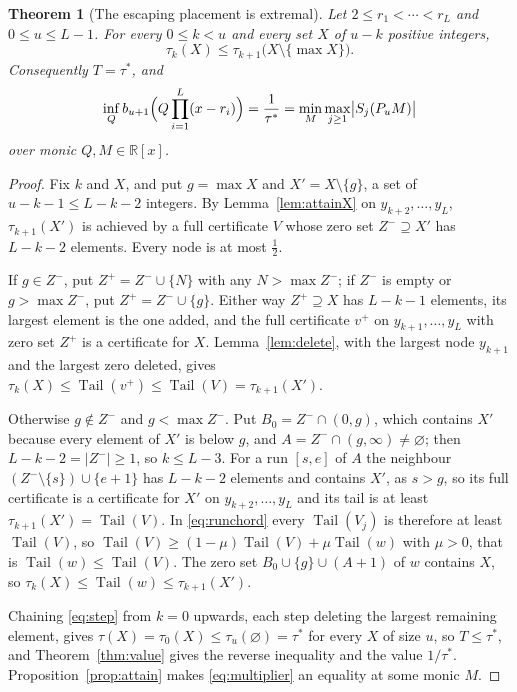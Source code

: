 \documentclass[11pt]{article}
\newtheorem{theorem}{Theorem}[section]
\theoremstyle{definition}
\theoremstyle{plain}
\newcommand{\R}{\mathbb R}
\DeclareMathOperator{\Tail}{Tail}
\begin{document}
\begin{theorem}[The escaping placement is extremal]\label{thm:extremal}
Let $2\le r_1<\cdots<r_L$ and $0\le u\le L-1$.  For every $0\le k<u$ and every
set $X$ of $u-k$ positive integers,
\begin{equation}\label{eq:step}
  \tau_k(X)\le\tau_{k+1}\bigl(X\setminus\{\max X\}\bigr).
\end{equation}
Consequently $T=\tau^*$, and
\[
  \inf_Qb_{u+1}\Bigl(Q\prod_{i=1}^L(x-r_i)\Bigr)=\frac1{\tau^*}
  =\min_M\max_{j\ge1}\bigl|S_j(P_uM)\bigr|
\]
over monic $Q,M\in\R[x]$.
\end{theorem}

\begin{proof}
Fix $k$ and $X$, and put $g=\max X$ and $X'=X\setminus\{g\}$, a set of
$u-k-1\le L-k-2$ integers.  By Lemma~\ref{lem:attainX} on
$y_{k+2},\ldots,y_L$, $\tau_{k+1}(X')$ is achieved by a full certificate $V$
whose zero set $Z^-\supseteq X'$ has $L-k-2$ elements.  Every node is at most
$\tfrac12$.

If $g\in Z^-$, put $Z^+=Z^-\cup\{N\}$ with any $N>\max Z^-$; if $Z^-$ is
empty or $g>\max Z^-$, put $Z^+=Z^-\cup\{g\}$.  Either way
$Z^+\supseteq X$ has $L-k-1$ elements, its largest element is the one added,
and the full certificate $v^+$ on $y_{k+1},\ldots,y_L$ with zero set $Z^+$ is a
certificate for $X$.  Lemma~\ref{lem:delete}, with the largest node $y_{k+1}$
and the largest zero deleted, gives
$\tau_k(X)\le\Tail(v^+)\le\Tail(V)=\tau_{k+1}(X')$.

Otherwise $g\notin Z^-$ and $g<\max Z^-$.  Put $B_0=Z^-\cap(0,g)$, which
contains $X'$ because every element of $X'$ is below $g$, and
$A=Z^-\cap(g,\infty)\ne\varnothing$; then $L-k-2=|Z^-|\ge1$, so $k\le L-3$.
For a run $[s,e]$ of $A$ the neighbour $(Z^-\setminus\{s\})\cup\{e+1\}$ has
$L-k-2$ elements and contains $X'$, as $s>g$, so its full certificate is a
certificate for $X'$ on $y_{k+2},\ldots,y_L$ and its tail is at least
$\tau_{k+1}(X')=\Tail(V)$.  In \eqref{eq:runchord} every $\Tail(V_j)$ is
therefore at least $\Tail(V)$, so
$\Tail(V)\ge(1-\mu)\Tail(V)+\mu\Tail(w)$ with $\mu>0$, that is
$\Tail(w)\le\Tail(V)$.  The zero set $B_0\cup\{g\}\cup(A+1)$ of $w$ contains
$X$, so $\tau_k(X)\le\Tail(w)\le\tau_{k+1}(X')$.

Chaining \eqref{eq:step} from $k=0$ upwards, each step deleting the largest
remaining element, gives $\tau(X)=\tau_0(X)\le\tau_u(\varnothing)=\tau^*$ for
every $X$ of size $u$, so $T\le\tau^*$, and Theorem~\ref{thm:value} gives the
reverse inequality and the value $1/\tau^*$.  Proposition~\ref{prop:attain}
makes \eqref{eq:multiplier} an equality at some monic $M$.
\end{proof}
\end{document}
